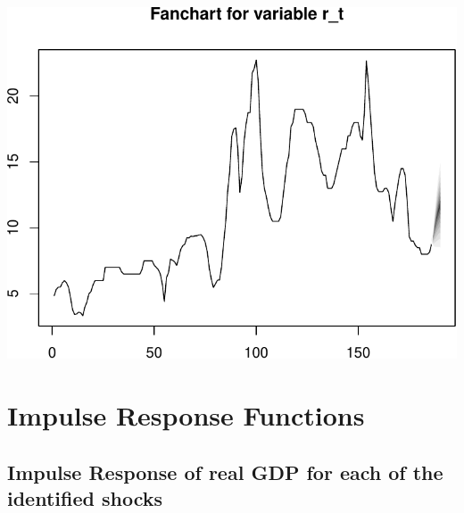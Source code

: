 \documentclass[11pt,preprint, authoryear]{elsarticle}
\numberwithin{equation}{section}
\numberwithin{figure}{section}
\numberwithin{table}{section}
\begin{document}
\includegraphics{TS_proj_files/figure-latex/unnamed-chunk-17-1.pdf}

\hypertarget{impulse-response-functions}{%
\section{Impulse Response Functions}\label{impulse-response-functions}}

\hypertarget{impulse-response-of-real-gdp-for-each-of-the-identified-shocks}{%
\subsection{Impulse Response of real GDP for each of the identified
shocks}\label{impulse-response-of-real-gdp-for-each-of-the-identified-shocks}}
\end{document}
